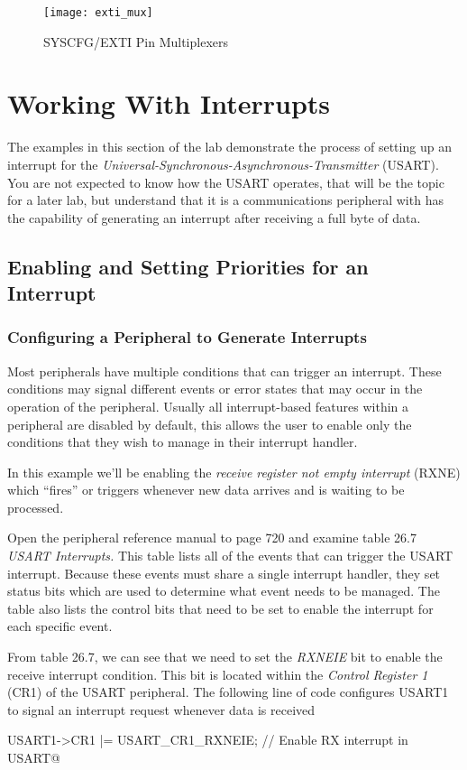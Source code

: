 \documentclass[11pt,fleqn]{book} %
\makeatletter
\newcommand{\ilcode}[1]{
    \smallskip
    \colorbox{gray!20!white}{
        \centering
        \parbox{\linewidth-2\fboxsep}{
            \lstinline@#1@
        }
    }
}
\makeatother
\begin{document}
\begin{figure}[]
    \centering\texttt{[image: exti\_mux]}
    \caption{SYSCFG/EXTI Pin Multiplexers}
    \label{exti_mux}
\end{figure}

\section{Working With Interrupts} 
The examples in this section of the lab demonstrate the process of setting up an interrupt for the \textit{Universal-Synchronous-Asynchronous-Transmitter} (USART). You are not expected to know how the USART operates, that will be the topic for a later lab, but understand that it is a communications peripheral with has the capability of generating an interrupt after receiving a full byte of data. 

\subsection{Enabling and Setting Priorities for an Interrupt}


\subsubsection{Configuring a Peripheral to Generate Interrupts} \label{periph_setup}
Most peripherals have multiple conditions that can trigger an interrupt. These conditions may signal different events or error states that may occur in the operation of the peripheral. Usually all interrupt-based features within a peripheral are disabled by default, this allows the user to enable only the conditions that they wish to manage in their interrupt handler. 

\begin{example}
     In this example we'll be enabling the \textit{receive register not empty interrupt} (RXNE) which ``fires'' or triggers whenever new data arrives and is waiting to be processed. 
    
    Open the peripheral reference manual to page 720 and examine table 26.7 \textit{USART Interrupts.} This table lists all of the events that can trigger the USART interrupt. Because these events must share a single interrupt handler, they set status bits which are used to determine what event needs to be managed. The table also lists the control bits that need to be set to enable the interrupt for each specific event.
    
    From table 26.7, we can see that we need to set the \textit{RXNEIE} bit to enable the receive interrupt condition. This bit is located within the \textit{Control Register 1} (CR1) of the USART peripheral. The following line of code configures USART1 to signal an interrupt request whenever data is received
    
    \ilcode{USART1->CR1 |= USART\_CR1\_RXNEIE;   // Enable RX interrupt in USART}
    \smallskip
\end{example}
\end{document}
